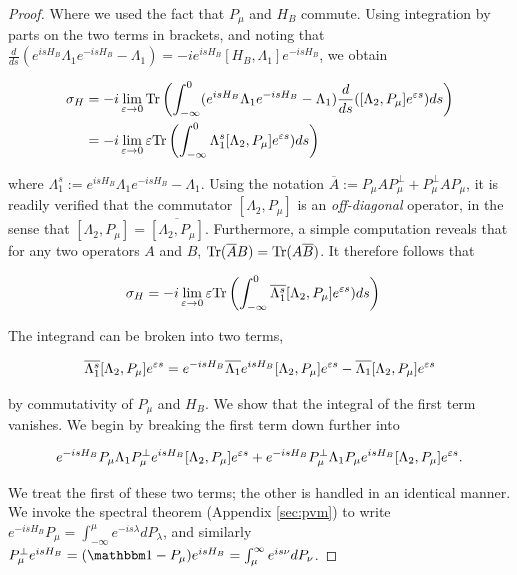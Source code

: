 \documentclass[12pt, letterpaper]{article}
\begin{document}
\begin{proof}
Where we used the fact that $P_\mu$ and $H_B$ commute. Using integration by parts on the two terms in brackets, and noting that $\frac{d}{ds}(e^{isH_B}\Lambda_1 e^{-isH_B} - \Lambda_1) = -ie^{isH_B}[H_B,\Lambda_1] e^{-isH_B}$, we obtain

\[\begin{aligned}
\sigma_H &= -i \lim_{\varepsilon\to 0}\text{Tr} \left( \int_{-\infty}^0 (e^{isH_B}\Lambda_1e^{-isH_B} - \Lambda_1)\frac{d}{ds}([\Lambda_2, P_\mu] e^{\varepsilon s})ds\right)\\
&= -i \lim_{\varepsilon\to 0}\varepsilon \text{Tr} \left( \int_{-\infty}^0 \Lambda_1^s[\Lambda_2, P_\mu] e^{\varepsilon s})ds\right)\\
\end{aligned}\]

where $\Lambda_1^s := e^{isH_B}\Lambda_1e^{-isH_B} - \Lambda_1$. Using the notation $\overline{A} := P_\mu AP_\mu^\perp + P_\mu^\perp A P_\mu$, it is readily verified that the commutator $[\Lambda_2, P_\mu]$ is an \textit{off-diagonal} operator, in the sense that  $[\Lambda_2, P_\mu] = \overline{[\Lambda_2,P_\mu]}$. Furthermore, a simple computation reveals that for any two operators $A$ and $B$, $\text{Tr}(\overline{A}B) = \text{Tr}(A\overline{B})$. It therefore follows that

\[\begin{aligned}
\sigma_H &= -i \lim_{\varepsilon\to 0}\varepsilon \text{Tr} \left( \int_{-\infty}^0 \overline{\Lambda_1^s}[\Lambda_2, P_\mu] e^{\varepsilon s})ds\right)
\end{aligned}\]

The integrand can be broken into two terms, 

\[\overline{\Lambda_1^s}[\Lambda_2, P_\mu] e^{\varepsilon s} = e^{-isH_B}\overline{\Lambda_1}e^{isH_B}[\Lambda_2, P_\mu]e^{\varepsilon s} - \overline{\Lambda_1}[\Lambda_2, P_\mu]e^{\varepsilon s}\]

by commutativity of $P_\mu$ and $H_B$. We show that the integral of the first term vanishes. We begin by breaking the first term down further into

\[e^{-isH_B}P_\mu \Lambda_1 P_\mu^\perp e^{isH_B}[\Lambda_2, P_\mu]e^{\varepsilon s} + e^{-isH_B}P_\mu^\perp \Lambda_1 P_\mu e^{isH_B}[\Lambda_2, P_\mu]e^{\varepsilon s}.\]

We treat the first of these two terms; the other is handled in an identical manner. We invoke the spectral theorem (Appendix \ref{sec:pvm}) to write $e^{-isH_B}P_\mu = \int_{-\infty}^\mu e^{-is\lambda}dP_\lambda$, and similarly $P_\mu^\perp e^{isH_B} = (\One- P_\mu) e^{isH_B} = \int_\mu^\infty e^{is\nu} dP_\nu$. 


\end{proof}
\end{document}
